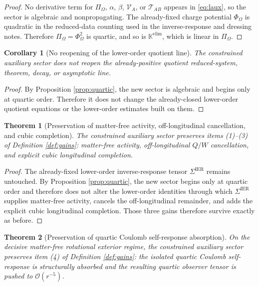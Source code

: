 \documentclass[11pt]{article}
\newcommand{\FlowPot}{\Phi_\Omega}
\newcommand{\BalanceField}{\Pi_\Omega}
\newcommand{\SigmaIER}{\Sigma^{\mathrm{IER}}}
\newcommand{\AuxPol}{\mathbb K}
\newtheorem{corollary}{Corollary}
\newtheorem{theorem}{Theorem}
\begin{document}
\begin{proof}
No derivative term for \(\BalanceField\), \(\alpha\), \(\beta\), \(\mathcal V_A\), or \(\mathcal T_{AB}\) appears in \eqref{eq:laux}, so the sector is algebraic and nonpropagating. The already-fixed charge potential \(\FlowPot\) is quadratic in the reduced-data counting used in the inverse-response and dressing notes. Therefore \(\BalanceField=\FlowPot^2\) is quartic, and so is \(\AuxPol^{\mathrm{elim}}\), which is linear in \(\BalanceField\).
\end{proof}

\begin{corollary}[No reopening of the lower-order quotient line]
\label{cor:nopde}
The constrained auxiliary sector does not reopen the already-positive quotient reduced-system, theorem, decay, or asymptotic line.
\end{corollary}

\begin{proof}
By Proposition \ref{prop:quartic}, the new sector is algebraic and begins only at quartic order. Therefore it does not change the already-closed lower-order quotient equations or the lower-order estimates built on them.
\end{proof}

\begin{theorem}[Preservation of matter-free activity, off-longitudinal cancellation, and cubic completion]
\label{thm:firstthree}
The constrained auxiliary sector preserves items (1)--(3) of Definition \ref{def:gains}: matter-free activity, off-longitudinal \(Q/W\) cancellation, and explicit cubic longitudinal completion.
\end{theorem}

\begin{proof}
The already-fixed lower-order inverse-response tensor \(\SigmaIER\) remains untouched. By Proposition \ref{prop:quartic}, the new sector begins only at quartic order and therefore does not alter the lower-order identities through which \(\SigmaIER\) supplies matter-free activity, cancels the off-longitudinal remainder, and adds the explicit cubic longitudinal completion. Those three gains therefore survive exactly as before.
\end{proof}

\begin{theorem}[Preservation of quartic Coulomb self-response absorption]
\label{thm:quarticabsorb}
On the decisive matter-free rotational exterior regime, the constrained auxiliary sector preserves item (4) of Definition \ref{def:gains}: the isolated quartic Coulomb self-response is structurally absorbed and the resulting quartic observer tensor is pushed to \(\mathcal O(r^{-5})\).
\end{theorem}
\end{document}

